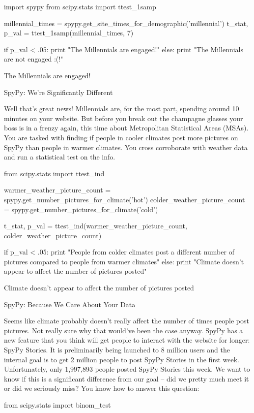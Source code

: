 \documentclass{journal}
\begin{document}
import spypy
from scipy.stats import ttest_1samp

millennial_times = spypy.get_site_times_for_demographic('millennial')
t_stat, p_val = ttest_1samp(millennial_times, 7)

if p_val < .05:
    print "The Millennials are engaged!"
else:
    print "The Millennials are not engaged :(!"

The Millennials are engaged!

SpyPy: We're Significantly Different

Well that's great news! Millennials are, for the most part, spending around 10 minutes on your website. But before you break out the champagne glasses your boss is in a frenzy again, this time about Metropolitan Statistical Areas (MSAs). You are tasked with finding if people in cooler climates post more pictures on SpyPy than people in warmer climates. You cross corroborate with weather data and run a statistical test on the info.

from scipy.stats import ttest_ind

warmer_weather_picture_count = spypy.get_number_pictures_for_climate('hot')
colder_weather_picture_count = spypy.get_number_pictures_for_climate('cold')

t_stat, p_val = ttest_ind(warmer_weather_picture_count, colder_weather_picture_count)

if p_val < .05:
    print "People from colder climates post a different number of pictures compared to people from warmer climates"
else:
    print "Climate doesn't appear to affect the number of pictures posted"

Climate doesn't appear to affect the number of pictures posted

SpyPy: Because We Care About Your Data

Seems like climate probably doesn't really affect the number of times people post pictures. Not really sure why that would've been the case anyway. SpyPy has a new feature that you think will get people to interact with the website for longer: SpyPy Stories. It is preliminarily being launched to 8 million users and the internal goal is to get 2 million people to post SpyPy Stories in the first week. Unfortunately, only 1,997,893 people posted SpyPy Stories this week. We want to know if this is a significant difference from our goal -- did we pretty much meet it or did we seriously miss? You know how to answer this question:

from scipy.stats import binom_test
\end{document}
